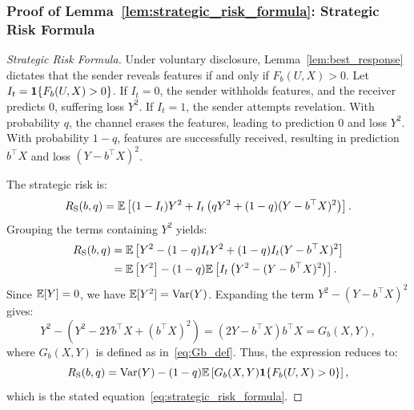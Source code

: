 \subsubsection*{Proof of Lemma~\ref{lem:strategic_risk_formula}: Strategic Risk Formula}
\label{app:proof_strategic_risk}
\begin{proof}[Strategic Risk Formula]
Under voluntary disclosure, Lemma~\ref{lem:best_response} dictates that the sender reveals features if and only if $F_b(U, X) > 0$. 
Let $I_t = \mathbf{1}\{F_b(U, X) > 0\}$.
If $I_t = 0$, the sender withholds features, and the receiver predicts $0$, suffering loss $Y^2$. 
If $I_t = 1$, the sender attempts revelation. With probability $q$, the channel erases the features, leading to prediction $0$ and loss $Y^2$. With probability $1 - q$, features are successfully received, resulting in prediction $b^\top X$ and loss $(Y - b^\top X)^2$. 

The strategic risk is:
\begin{equation}
    R_{\mathrm{S}}(b, q) = \mathbb{E}\left[ (1 - I_t) Y^2 + I_t \left( q Y^2 + (1 - q)(Y - b^\top X)^2 \right) \right].
\end{equation}
Grouping the terms containing $Y^2$ yields:
\begin{align}
    R_{\mathrm{S}}(b, q) &= \mathbb{E}\left[ Y^2 - (1 - q)I_t Y^2 + (1 - q)I_t (Y - b^\top X)^2 \right] \nonumber \\
    &= \mathbb{E}\left[ Y^2 \right] - (1 - q) \mathbb{E}\left[ I_t \left( Y^2 - (Y - b^\top X)^2 \right) \right].
\end{align}
Since $\mathbb{E}[Y] = 0$, we have $\mathbb{E}[Y^2] = \mathrm{Var}(Y)$. Expanding the term $Y^2 - (Y - b^\top X)^2$ gives:
\begin{equation}
    Y^2 - (Y^2 - 2Y b^\top X + (b^\top X)^2) = (2Y - b^\top X)b^\top X = G_b(X, Y),
\end{equation}
where $G_b(X, Y)$ is defined as in~\eqref{eq:Gb_def}. Thus, the expression reduces to:
\begin{equation}
    R_{\mathrm{S}}(b, q) = \mathrm{Var}(Y) - (1 - q)\mathbb{E}\left[ G_b(X, Y) \mathbf{1}\{F_b(U, X) > 0\} \right],
\end{equation}
which is the stated equation~\eqref{eq:strategic_risk_formula}.
\end{proof}

